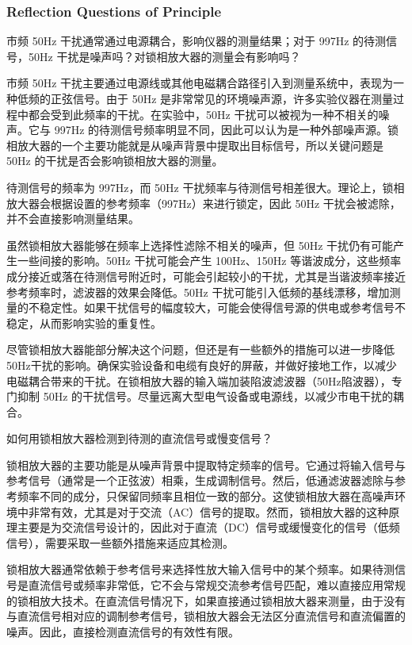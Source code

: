 \subsubsection{Reflection Questions of Principle}

\begin{question}
	市频 50Hz 干扰通常通过电源耦合，影响仪器的测量结果；对于 997Hz 的待测信号，50Hz 干扰是噪声吗？对锁相放大器的测量会有影响吗？
\end{question}
市频 50Hz 干扰主要通过电源线或其他电磁耦合路径引入到测量系统中，表现为一种低频的正弦信号。由于 50Hz 是非常常见的环境噪声源，许多实验仪器在测量过程中都会受到此频率的干扰。在实验中，50Hz 干扰可以被视为一种不相关的噪声。它与 997Hz 的待测信号频率明显不同，因此可以认为是一种外部噪声源。锁相放大器的一个主要功能就是从噪声背景中提取出目标信号，所以关键问题是 50Hz 的干扰是否会影响锁相放大器的测量。

待测信号的频率为 997Hz，而 50Hz 干扰频率与待测信号相差很大。理论上，锁相放大器会根据设置的参考频率（997Hz）来进行锁定，因此 50Hz 干扰会被滤除，并不会直接影响测量结果。

虽然锁相放大器能够在频率上选择性滤除不相关的噪声，但 50Hz 干扰仍有可能产生一些间接的影响。50Hz 干扰可能会产生 100Hz、150Hz 等谐波成分，这些频率成分接近或落在待测信号附近时，可能会引起较小的干扰，尤其是当谐波频率接近参考频率时，滤波器的效果会降低。50Hz 干扰可能引入低频的基线漂移，增加测量的不稳定性。如果干扰信号的幅度较大，可能会使得信号源的供电或参考信号不稳定，从而影响实验的重复性。

尽管锁相放大器能部分解决这个问题，但还是有一些额外的措施可以进一步降低50Hz干扰的影响。确保实验设备和电缆有良好的屏蔽，并做好接地工作，以减少电磁耦合带来的干扰。在锁相放大器的输入端加装陷波滤波器（50Hz陷波器），专门抑制 50Hz 的干扰信号。尽量远离大型电气设备或电源线，以减少市电干扰的耦合。

\begin{question}
	如何用锁相放大器检测到待测的直流信号或慢变信号？
\end{question}
锁相放大器的主要功能是从噪声背景中提取特定频率的信号。它通过将输入信号与参考信号（通常是一个正弦波）相乘，生成调制信号。然后，低通滤波器滤除与参考频率不同的成分，只保留同频率且相位一致的部分。这使锁相放大器在高噪声环境中非常有效，尤其是对于交流（AC）信号的提取。然而，锁相放大器的这种原理主要是为交流信号设计的，因此对于直流（DC）信号或缓慢变化的信号（低频信号），需要采取一些额外措施来适应其检测。

锁相放大器通常依赖于参考信号来选择性放大输入信号中的某个频率。如果待测信号是直流信号或频率非常低，它不会与常规交流参考信号匹配，难以直接应用常规的锁相放大技术。在直流信号情况下，如果直接通过锁相放大器来测量，由于没有与直流信号相对应的调制参考信号，锁相放大器会无法区分直流信号和直流偏置的噪声。因此，直接检测直流信号的有效性有限。

